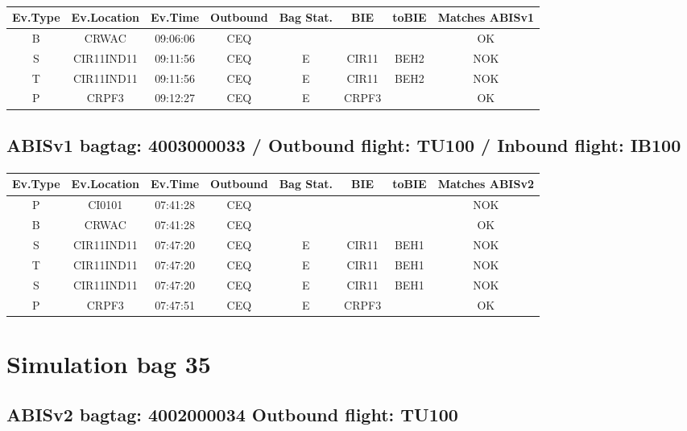 \documentclass{report}
\begin{document}
\paragraph{}
\begin{longtable}{cccccccc}    \toprule
\rowcolor{white!50}
\textbf{Ev.Type} & \textbf{Ev.Location} & \textbf{Ev.Time} & \textbf{Outbound} & \textbf{Bag Stat.} & \textbf{BIE} & \textbf{toBIE} & \textbf{Matches ABISv1} \\\midrule
B & CRWAC & 09:06:06  & CEQ &  &  &  & OK\\
S & CIR11IND11 & 09:11:56  & CEQ & E & CIR11 & BEH2 & NOK\\
T & CIR11IND11 & 09:11:56  & CEQ & E & CIR11 & BEH2 & NOK\\
P & CRPF3 & 09:12:27  & CEQ & E & CRPF3 &  & OK\\
\bottomrule
\end{longtable}
\subsection*{ABISv1 bagtag: 4003000033 / Outbound flight: TU100 / Inbound flight: IB100}
\paragraph{}
\begin{longtable}{cccccccc}    \toprule
\rowcolor{white!50}
\textbf{Ev.Type} & \textbf{Ev.Location} & \textbf{Ev.Time} & \textbf{Outbound} & \textbf{Bag Stat.} & \textbf{BIE} & \textbf{toBIE} & \textbf{Matches ABISv2} \\\midrule
P & CI0101 & 07:41:28  & CEQ &  &  &  & NOK\\
B & CRWAC & 07:41:28  & CEQ &  &  &  & OK\\
S & CIR11IND11 & 07:47:20  & CEQ & E & CIR11 & BEH1 & NOK\\
T & CIR11IND11 & 07:47:20  & CEQ & E & CIR11 & BEH1 & NOK\\
S & CIR11IND11 & 07:47:20  & CEQ & E & CIR11 & BEH1 & NOK\\
P & CRPF3 & 07:47:51  & CEQ & E & CRPF3 &  & OK\\
\bottomrule
\end{longtable}
\pagebreak
\section*{Simulation bag 35}
\subsection*{ABISv2 bagtag: 4002000034 Outbound flight: TU100}
\end{document}
